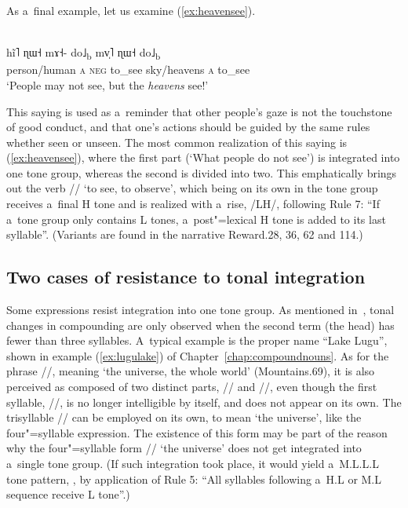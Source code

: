 As a~final example, let us examine (\ref{ex:heavensee}).

\begin{exe}
	\ex
	\label{ex:heavensee}
	\\
	\gll hĩ˥	ɳɯ˧	mɤ˧-	do˩\textsubscript{b}		mv̩˥	ɳɯ˧		do˩\textsubscript{b}\\
	person/human	\textsc{a}		\textsc{neg}	to\_see			sky/heavens		\textsc{a}		to\_see\\
	\glt ‘People may not see, but the \textit{heavens} see!’
\end{exe}

This saying is used as a~reminder that other people’s gaze is not the touchstone of good conduct,
and that one’s actions should be guided by the same rules whether seen or unseen. The most common
realization of this saying is (\ref{ex:heavensee}), where the first part
(‘What people do not see’) is integrated into one tone group, whereas the second is divided
into two. This emphatically brings out the verb // ‘to see, to observe’, which being on its
own in the tone group receives a~final H tone and is realized with a~rise, /LH/, following Rule
7: “If a~tone group only contains L tones, a~post"=lexical H tone is added to its last
syllable”. (Variants are found in the narrative Reward.28, 36, 62 and 114.)


\subsection{Two cases of resistance to tonal integration}
\label{sec:acaseofresistancetotonalintegration}

Some expressions resist integration into
one tone group. As mentioned in~, tonal changes in compounding are only observed when the second term (the
head) has fewer than three syllables. A~typical example is the proper name “Lake Lugu”, shown in example (\ref{ex:lugulake}) of Chapter~\ref{chap:compoundnouns}. As for the phrase //, meaning ‘the universe, the whole world’ (Mountains.69), it is also perceived as composed of two distinct parts,
// and //, even though the first syllable, //, is no longer
intelligible by itself, and does not appear on its own. The trisyllable // can be employed on its own, to mean ‘the universe’, like the four"=syllable expression. The existence of
this  form may be part of the reason why the four"=syllable form // ‘the
universe’ does not get integrated into a~single tone group. (If such integration took place, it
would yield a~M.L.L.L tone pattern, , by application of Rule 5: “All syllables following a~H.L or M.L sequence receive L tone”.)

